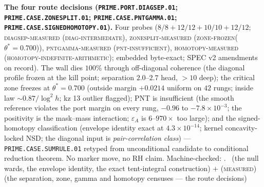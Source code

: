 \par\smallskip\noindent\textbf{The four route decisions
(\texttt{PRIME.PORT.\allowbreak DIAGSEP.01};
\texttt{PRIME.CASE.\allowbreak ZONESPLIT.01};
\texttt{PRIME.CASE.\allowbreak PNTGAMMA.01};
\texttt{PRIME.CASE.\allowbreak SIGNEDHOMOTOPY.01}).}
Four probes ($8/8 + 12/12 + 10/10 + 12/12$;
\textsc{diagsep-measured (diag-intermediate)},
\textsc{zonesplit-measured (zone-frozen($\theta^{*} = 0.700$))},
\textsc{pntgamma-measured (pnt-insufficient)},
\textsc{homotopy-measured (homotopy-indefinite-arithmetic)};
embedded byte-exact; SPEC v2 amendments on record).  The wall
dies $100\%$ through off-diagonal coherence (the diagonal
profile frozen at the kill point; separation $2.0$--$2.7$ head,
$> 10$ deep); the critical zone freezes at $\theta^{*} = 0.700$
(outside margin $+0.0214$ uniform on $42$ rungs; inside law
${\sim}0.87/\log^2 h$; kz 13 outlier flagged); PNT is
insufficient (the smooth reference violates the port margin on
every rung, $-0.96$ to $-7.8\times10^{-3}$; the positivity is
the mask--mass interaction; $\varepsilon_A$ is $6$--$970\times$
too large); and the signed-homotopy classification (envelope
identity exact at $4.3\times10^{-14}$; kernel concavity-locked
NSD; the diagonal input is \emph{pair-correlation class}) ---
\texttt{PRIME.CASE.SUMRULE.01} retyped from unconditional
candidate to conditional reduction theorem.  No marker move, no
RH claim.
Machine-checked: .
\mE\ (the null wards, the envelope identity, the exact
tent-integral construction) $+$ (\textsc{measured}) (the
separation, zone, gamma and homotopy censuses --- the route
decisions)
\par\smallskip


